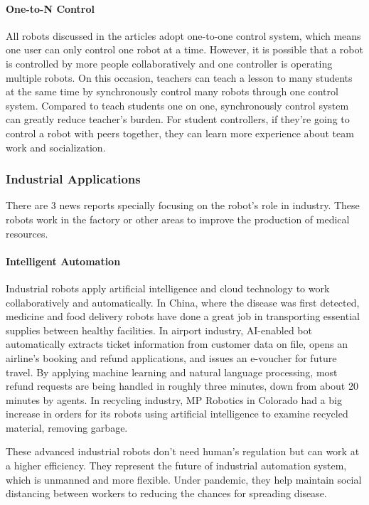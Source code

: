 \documentclass[a4paper]{article}
\begin{document}
\paragraph{One-to-N Control}
    All robots discussed in the articles adopt one-to-one control system, which means one user can only control one robot at a time. However, it is possible that a robot is controlled by more people collaboratively and one controller is operating multiple robots. On this occasion, teachers can teach a lesson to many students at the same time by synchronously control many robots through one control system. Compared to teach students one on one, synchronously control system can greatly reduce teacher's burden. For student controllers, if they're going to control a robot with peers together, they can learn more experience about team work and socialization.
\subsubsection{Industrial Applications}
    There are 3 news reports specially focusing on the robot's role in industry. These robots work in the factory or other areas to improve the production of medical resources. 
\paragraph{Intelligent Automation} 
    Industrial robots apply artificial intelligence and cloud technology to work collaboratively and automatically. In China, where the disease was first detected, medicine and food delivery robots have done a great job in transporting essential supplies between healthy facilities. In airport industry, AI-enabled bot automatically extracts ticket information from customer data on file, opens an airline's booking and refund applications, and issues an e-voucher for future travel. By applying machine learning and natural language processing, most refund requests are being handled in roughly three minutes, down from about 20 minutes by agents. In recycling industry, MP Robotics in Colorado had a big increase in orders for its robots using artificial intelligence to examine recycled material, removing garbage\cite{61}. 
\par 
    These advanced industrial robots don't need human's regulation but can work at a higher efficiency. They represent the future of industrial automation system, which is unmanned and more flexible. Under pandemic, they help maintain social distancing between workers to reducing the chances for spreading disease. 
\end{document}
